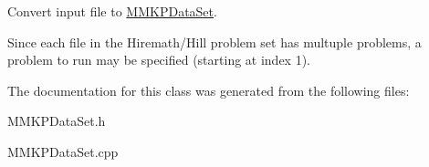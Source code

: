 Convert input file to \hyperlink{class_m_m_k_p_data_set}{M\+M\+K\+P\+Data\+Set}. 

Since each file in the Hiremath/\+Hill problem set has multuple problems, a problem to run may be specified (starting at index 1). 

The documentation for this class was generated from the following files\+:\begin{DoxyCompactItemize}
\item 
M\+M\+K\+P\+Data\+Set.\+h\item 
M\+M\+K\+P\+Data\+Set.\+cpp\end{DoxyCompactItemize}
